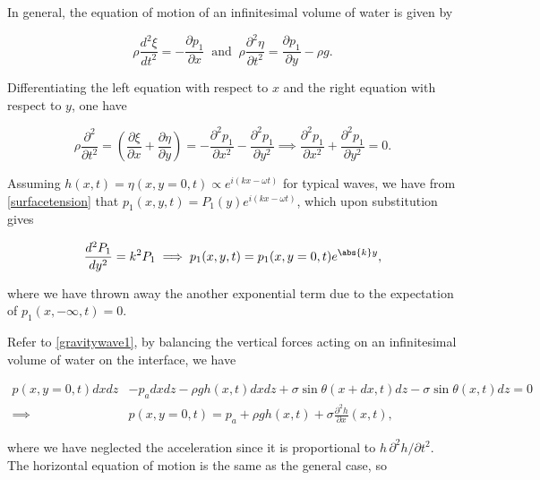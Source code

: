 \documentclass[a4paper,12pt]{report}
\begin{document}
In general, the equation of motion of an infinitesimal volume of water is given by 

\begin{equation}
	\rho \frac{d^2\xi }{dt^2} = - \frac{\partial p_1 }{\partial x} ~\text { and }~ \rho \frac{\partial^2 \eta }{\partial t^2} = \frac{\partial p_1}{\partial y} - \rho g.    
\end{equation}

Differentiating the left equation with respect to \(x\) and the right equation with respect to \(y\), one have 

\begin{equation}
	\rho \frac{\partial^2 }{\partial t^2} = \left( \frac{\partial \xi }{\partial x} + \frac{\partial \eta }{\partial y}  \right) = - \frac{\partial^2 p_1 }{\partial x^2} - \frac{\partial^2 p_1 }{\partial y^2} \implies \frac{\partial^2 p_{1} }{\partial x^2} + \frac{\partial^2 p_1 }{\partial y^2} = 0.   
\end{equation}

Assuming \(h(x,t) = \eta (x,y=0,t) \propto e^{i(kx-\omega t)} \) for typical waves, we have from \cref{surfacetension} that \(p_1 (x,y,t) = P_1 (y) e^{i(kx- \omega t)} \), which upon substitution gives

\begin{equation}
	\frac{d^2P_1 }{dy^2} = k^2P_1 \implies p_1 (x,y,t) = p_1 (x,y=0,t)e^{\abs{k} y},  
\end{equation}

where we have thrown away the another exponential term due to the expectation of \(p_1 (x,-\infty,t) = 0\). 



Refer to \cref{gravitywave1}, by balancing the vertical forces acting on an infinitesimal volume of water on the interface, we have


\begin{equation} \label{surfacetension} 
	\begin{aligned} 
	p(x,y=0,t) dxdz &- p_{a} dxdz - \rho g h(x,t) dxdz + \sigma \sin \theta (x+dx,t)dz - \sigma \sin \theta (x,t)dz = 0 \\
	\implies &p(x,y=0,t) = p_{a} + \rho g h(x,t) + \sigma \frac{\partial^2 h}{\partial x} (x,t),
	\end{aligned} 
\end{equation}

where we have neglected the acceleration since it is proportional to \(h\,\partial ^2h/\partial t^2\). The horizontal equation of motion is the same as the general case, so
\end{document}
